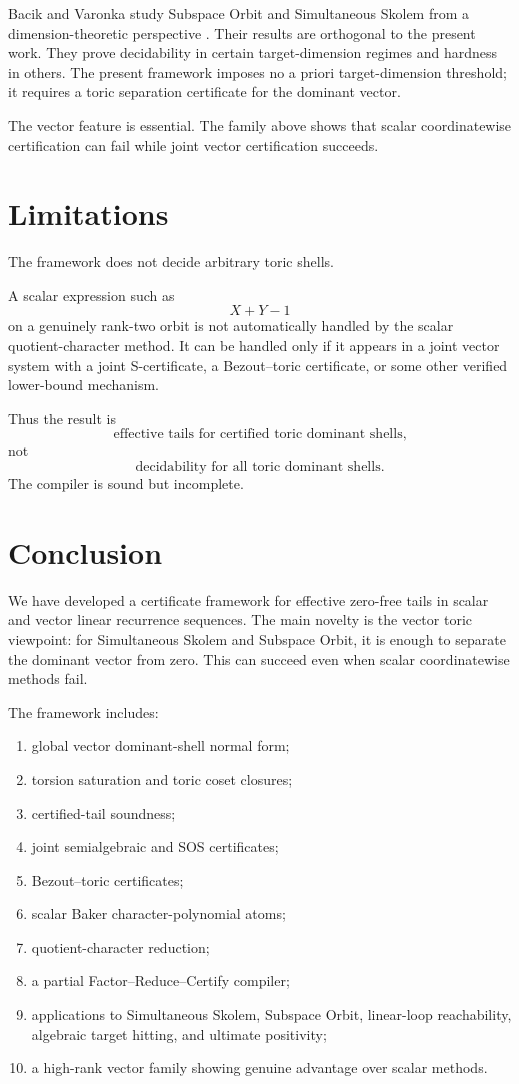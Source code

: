 \documentclass[11pt]{article}
\begin{document}
Bacik and Varonka study Subspace Orbit and Simultaneous Skolem from a dimension-theoretic perspective \cite{BacikVaronka}. Their results are orthogonal to the present work. They prove decidability in certain target-dimension regimes and hardness in others. The present framework imposes no a priori target-dimension threshold; it requires a toric separation certificate for the dominant vector.

The vector feature is essential. The family above shows that scalar coordinatewise certification can fail while joint vector certification succeeds.

\section{Limitations}

The framework does not decide arbitrary toric shells.

A scalar expression such as
\[
X+Y-1
\]
on a genuinely rank-two orbit is not automatically handled by the scalar quotient-character method. It can be handled only if it appears in a joint vector system with a joint S-certificate, a Bezout--toric certificate, or some other verified lower-bound mechanism.

Thus the result is
\[
\text{effective tails for certified toric dominant shells,}
\]
not
\[
\text{decidability for all toric dominant shells.}
\]
The compiler is sound but incomplete.

\section{Conclusion}

We have developed a certificate framework for effective zero-free tails in scalar and vector linear recurrence sequences. The main novelty is the vector toric viewpoint: for Simultaneous Skolem and Subspace Orbit, it is enough to separate the dominant vector from zero. This can succeed even when scalar coordinatewise methods fail.

The framework includes:
\begin{enumerate}
\item global vector dominant-shell normal form;
\item torsion saturation and toric coset closures;
\item certified-tail soundness;
\item joint semialgebraic and SOS certificates;
\item Bezout--toric certificates;
\item scalar Baker character-polynomial atoms;
\item quotient-character reduction;
\item a partial Factor--Reduce--Certify compiler;
\item applications to Simultaneous Skolem, Subspace Orbit, linear-loop reachability, algebraic target hitting, and ultimate positivity;
\item a high-rank vector family showing genuine advantage over scalar methods.
\end{enumerate}
\end{document}
